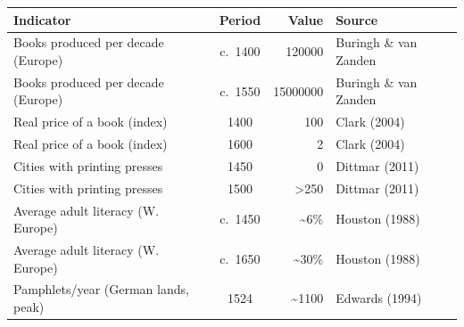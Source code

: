 \begin{tabular}{lcrl}
  \toprule
Indicator & Period & Value & Source \\ 
  \midrule
Books produced per decade (Europe) & c.~1400 & \num{120000} & Buringh \& van Zanden \\ 
  Books produced per decade (Europe) & c.~1550 & \num{15000000} & Buringh \& van Zanden \\ 
  Real price of a book (index) & 1400 & 100 & Clark (2004) \\ 
  Real price of a book (index) & 1600 & 2 & Clark (2004) \\ 
  Cities with printing presses & 1450 & 0 & Dittmar (2011) \\ 
  Cities with printing presses & 1500 & \textgreater 250 & Dittmar (2011) \\ 
  Average adult literacy (W. Europe) & c.~1450 & \textasciitilde 6\% & Houston (1988) \\ 
  Average adult literacy (W. Europe) & c.~1650 & \textasciitilde 30\% & Houston (1988) \\ 
  Pamphlets/year (German lands, peak) & 1524 & \textasciitilde \num{1100} & Edwards (1994) \\ 
   \bottomrule
\end{tabular}

